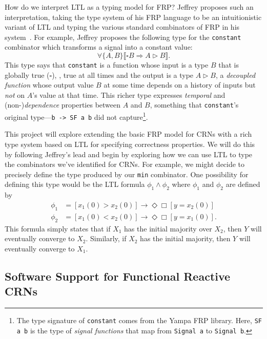 How do we interpret LTL as a typing model for FRP?
Jeffrey proposes such an interpretation, taking the type system of his FRP language to be an intuitionistic variant of LTL and typing the various standard combinators of FRP in his system~\cite{jeffrey2012}.
For example, Jeffrey proposes the following type for the \lstinline!constant! combinator which transforms a signal into a constant value:
\[
  \forall \{A, B \} \llbracket \square B \Rightarrow A \rhd B \rrbracket.
\]
This type says that \lstinline!constant! is a function whose input is a type $B$ that is globally true ($\square$), \ie, true at all times and the output is a type $A \rhd B$, a \emph{decoupled function} whose output value $B$ at some time depends on a history of inputs but \emph{not} on $A$'s value at that time.
This richer type expresses \emph{temporal} and (non-)\emph{dependence} properties between $A$ and $B$, something that \lstinline!constant!'s original type---\lstinline!b -> SF a b! did not capture\footnote{%
  The type signature of \lstinline!constant! comes from the Yampa FRP library.
  Here, \lstinline!SF a b! is the type of \emph{signal functions} that map from \lstinline!Signal a! to \lstinline!Signal b!.
}.

This project will explore extending the basic FRP model for CRNs with a rich type system based on LTL for specifying correctness properties.
We will do this by following Jeffrey's lead and begin by exploring how we can use LTL to type the combinators we've identified for CRNs.
For example, we might decide to precisely define the type produced by our \lstinline!min! combinator.
One possibility for defining this type would be the LTL formula \( \phi_1 \land \phi_2 \) where \( \phi_1 \) and \( \phi_2 \) are defined by
\begin{align*}
  \phi_1 &= [x_1(0) > x_2(0)]\rightarrow\Diamond\Box[y = x_2(0)]\\
  \phi_2 &= [x_1(0) < x_2(0)]\rightarrow\Diamond\Box[y = x_1(0)].
\end{align*}
This formula simply states that if \( X_1 \) has the initial majority over \( X_2 \), then \( Y \) will eventually converge to \( X_2 \).
Similarly, if \( X_2 \) has the initial majority, then \( Y \) will eventually converge to \( X_1 \).



\subsection{Software Support for Functional Reactive CRNs}

